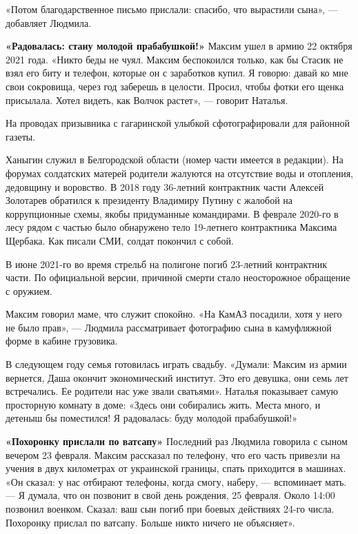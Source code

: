 «Потом благодарственное письмо прислали: спасибо, что вырастили сына», --- добавляет Людмила.


\textbf{«Радовалась: стану молодой прабабушкой!»}
Максим ушел в армию 22 октября 2021 года. «Никто беды не чуял. Максим беспокоился только, как бы Стасик не взял его биту и телефон, которые он с заработков купил. Я говорю: давай ко мне свои сокровища, через год заберешь в целости. Просил, чтобы фотки его щенка присылала. Хотел видеть, как Волчок растет», --- говорит Наталья.

На проводах призывника с гагаринской улыбкой сфотографировали для районной газеты.

Ханыгин служил в Белгородской области (номер части имеется в редакции). На форумах солдатских матерей родители жалуются на отсутствие воды и отопления, дедовщину и воровство. В 2018 году 36-летний контрактник части Алексей Золотарев обратился к президенту Владимиру Путину с жалобой на коррупционные схемы, якобы придуманные командирами. В феврале 2020-го в лесу рядом с частью было обнаружено тело 19-летнего контрактника Максима Щербака. Как писали СМИ, солдат покончил с собой.

\begin{fancyquotes}
    В июне 2021-го во время стрельб на полигоне погиб 23-летний контрактник части. По официальной версии, причиной смерти стало неосторожное обращение с оружием.
\end{fancyquotes}

Максим говорил маме, что служит спокойно. «На КамАЗ посадили, хотя у него не было прав», --- Людмила рассматривает фотографию сына в камуфляжной форме в кабине грузовика.

В следующем году семья готовилась играть свадьбу. «Думали: Максим из армии вернется, Даша окончит экономический институт. Это его девушка, они семь лет встречались. Ее родители нас уже звали сватьями». Наталья показывает самую просторную комнату в доме: «Здесь они собирались жить. Места много, и детеныш бы поместился! Я радовалась: буду молодой прабабушкой!»

\textbf{«Похоронку прислали по ватсапу»}
Последний раз Людмила говорила с сыном вечером 23 февраля. Максим рассказал по телефону, что его часть привезли на учения в двух километрах от украинской границы, спать приходится в машинах. «Он сказал: у нас отбирают телефоны, когда смогу, наберу, --- вспоминает мать. --- Я думала, что он позвонит в свой день рождения, 25 февраля. Около 14:00 позвонил военком. Сказал: ваш сын погиб при боевых действиях 24-го числа. Похоронку прислал по ватсапу. Больше никто ничего не объясняет».

